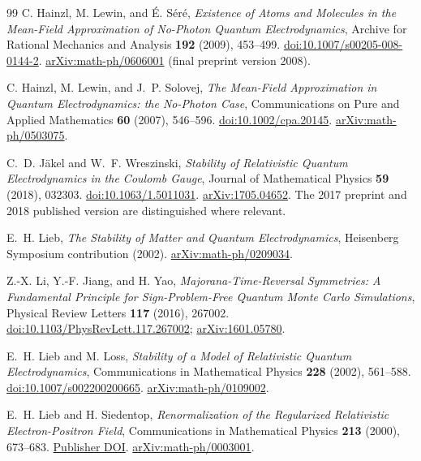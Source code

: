 \begin{thebibliography}{99}
C. Hainzl, M. Lewin, and \'{E}. S\'er\'e,
\emph{Existence of Atoms and Molecules in the Mean-Field Approximation of No-Photon Quantum Electrodynamics},
Archive for Rational Mechanics and Analysis \textbf{192} (2009), 453--499.
\href{https://doi.org/10.1007/s00205-008-0144-2}{doi:10.1007/s00205-008-0144-2}.
\href{https://arxiv.org/abs/math-ph/0606001}{arXiv:math-ph/0606001}
(final preprint version 2008).

C. Hainzl, M. Lewin, and J.~P. Solovej,
\emph{The Mean-Field Approximation in Quantum Electrodynamics: the No-Photon Case},
Communications on Pure and Applied Mathematics \textbf{60} (2007), 546--596.
\href{https://doi.org/10.1002/cpa.20145}{doi:10.1002/cpa.20145}.
\href{https://arxiv.org/abs/math-ph/0503075}{arXiv:math-ph/0503075}.

C.~D. J\"akel and W.~F. Wreszinski,
\emph{Stability of Relativistic Quantum Electrodynamics in the Coulomb Gauge},
Journal of Mathematical Physics \textbf{59} (2018), 032303.
\href{https://doi.org/10.1063/1.5011031}{doi:10.1063/1.5011031}.
\href{https://arxiv.org/abs/1705.04652}{arXiv:1705.04652}.
The 2017 preprint and 2018 published version are distinguished where relevant.

E.~H. Lieb,
\emph{The Stability of Matter and Quantum Electrodynamics},
Heisenberg Symposium contribution (2002).
\href{https://arxiv.org/abs/math-ph/0209034}{arXiv:math-ph/0209034}.

Z.-X. Li, Y.-F. Jiang, and H. Yao,
\emph{Majorana-Time-Reversal Symmetries: A Fundamental Principle for
Sign-Problem-Free Quantum Monte Carlo Simulations},
Physical Review Letters \textbf{117} (2016), 267002.
\href{https://doi.org/10.1103/PhysRevLett.117.267002}{doi:10.1103/PhysRevLett.117.267002};
\href{https://arxiv.org/abs/1601.05780}{arXiv:1601.05780}.

E.~H. Lieb and M. Loss,
\emph{Stability of a Model of Relativistic Quantum Electrodynamics},
Communications in Mathematical Physics \textbf{228} (2002), 561--588.
\href{https://doi.org/10.1007/s002200200665}{doi:10.1007/s002200200665}.
\href{https://arxiv.org/abs/math-ph/0109002}{arXiv:math-ph/0109002}.

E.~H. Lieb and H. Siedentop,
\emph{Renormalization of the Regularized Relativistic Electron-Positron Field},
Communications in Mathematical Physics \textbf{213} (2000), 673--683.
\href{https://doi.org/10.1007/s002200000265}{Publisher DOI}.
\href{https://arxiv.org/abs/math-ph/0003001}{arXiv:math-ph/0003001}.


\end{thebibliography}
